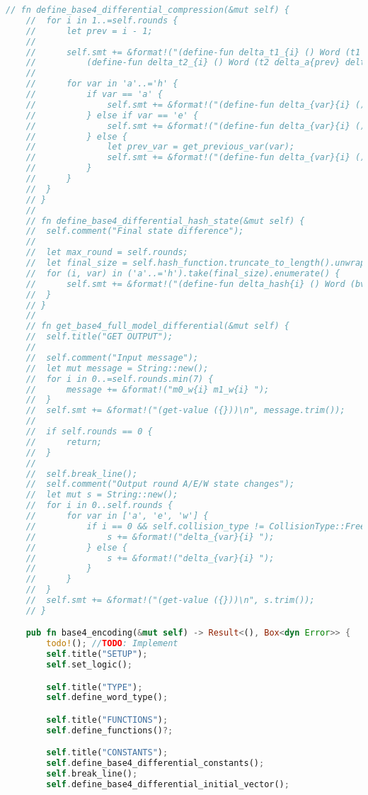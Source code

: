 \begin{lstlisting}[language=rust, caption={smt\_lib/encodings/base4.rs}]
	// fn define_base4_differential_compression(&mut self) {
	// 	for i in 1..=self.rounds {
	// 		let prev = i - 1;
	//
	// 		self.smt += &format!("(define-fun delta_t1_{i} () Word (t1 delta_h{prev} delta_e{prev} delta_f{prev} delta_g{prev} delta_k{prev} delta_w{prev}))\n\
	// 			(define-fun delta_t2_{i} () Word (t2 delta_a{prev} delta_b{prev} delta_c{prev}))\n");
	//
	// 		for var in 'a'..='h' {
	// 			if var == 'a' {
	// 				self.smt += &format!("(define-fun delta_{var}{i} () Word (bvadd delta_t1_{i} delta_t2_{i}))\n");
	// 			} else if var == 'e' {
	// 				self.smt += &format!("(define-fun delta_{var}{i} () Word (bvadd delta_d{prev} delta_t1_{i}))\n");
	// 			} else {
	// 				let prev_var = get_previous_var(var);
	// 				self.smt += &format!("(define-fun delta_{var}{i} () Word delta_{prev_var}{prev})\n");
	// 			}
	// 		}
	// 	}
	// }
	//
	// fn define_base4_differential_hash_state(&mut self) {
	// 	self.comment("Final state difference");
	//
	// 	let max_round = self.rounds;
	// 	let final_size = self.hash_function.truncate_to_length().unwrap_or(8);
	// 	for (i, var) in ('a'..='h').take(final_size).enumerate() {
	// 		self.smt += &format!("(define-fun delta_hash{i} () Word (bvadd delta_{var}0 delta_{var}{max_round}))\n");
	// 	}
	// }
	//
	// fn get_base4_full_model_differential(&mut self) {
	// 	self.title("GET OUTPUT");
	//
	// 	self.comment("Input message");
	// 	let mut message = String::new();
	// 	for i in 0..=self.rounds.min(7) {
	// 		message += &format!("m0_w{i} m1_w{i} ");
	// 	}
	// 	self.smt += &format!("(get-value ({}))\n", message.trim());
	//
	// 	if self.rounds == 0 {
	// 		return;
	// 	}
	//
	// 	self.break_line();
	// 	self.comment("Output round A/E/W state changes");
	// 	let mut s = String::new();
	// 	for i in 0..self.rounds {
	// 		for var in ['a', 'e', 'w'] {
	// 			if i == 0 && self.collision_type != CollisionType::FreeStart && var != 'w' {
	// 				s += &format!("delta_{var}{i} ");
	// 			} else {
	// 				s += &format!("delta_{var}{i} ");
	// 			}
	// 		}
	// 	}
	// 	self.smt += &format!("(get-value ({}))\n", s.trim());
	// }

	pub fn base4_encoding(&mut self) -> Result<(), Box<dyn Error>> {
		todo!(); //TODO: Implement
		self.title("SETUP");
		self.set_logic();

		self.title("TYPE");
		self.define_word_type();

		self.title("FUNCTIONS");
		self.define_functions()?;

		self.title("CONSTANTS");
		self.define_base4_differential_constants();
		self.break_line();
		self.define_base4_differential_initial_vector();


\end{lstlisting}

